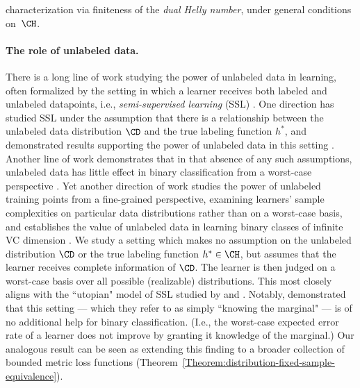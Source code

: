 \documentclass[11pt]{article}
\begin{document}
characterization via finiteness of the \emph{dual Helly number}, under general conditions on~$\CH$.  

\paragraph{The role of unlabeled data.} There is a long line of work studying the power of unlabeled data in learning, often formalized by the setting in which a learner receives both labeled and unlabeled datapoints, i.e., \emph{semi-supervised learning} (SSL) \citep{kaariainen2005generalization,zhu2005semi,chapelle2006semi,van2020survey}. One direction has studied SSL under the assumption that there is a relationship between the unlabeled data distribution $\CD$ and the true labeling function $h^*$, and demonstrated results supporting the power of unlabeled data in this setting \citep{castelli1995exponential,seeger2000learning,rigollet2007generalization,singh2008unlabeled,niyogi2013manifold}. Another line of work demonstrates that in that absence of any such assumptions, unlabeled data has little effect in binary classification from a worst-case perspective \citep{ben2008does,darnstadt2011smart,gopfert2019can}. Yet another direction of work studies the power of unlabeled training points from a fine-grained perspective, examining learners' sample complexities on particular data distributions rather than on a worst-case basis, and establishes the value of unlabeled data in learning binary classes of infinite VC dimension \citep{darnstadt2013unlabeled}.
We study a setting which makes no assumption on the unlabeled distribution $\CD$ or the true labeling function $h^* \in \CH$, but assumes that the learner receives complete information of $\CD$. The learner is then judged on a worst-case basis over all possible (realizable) distributions. This most closely aligns with the ``utopian" model of SSL studied by \citet{ben2008does} and \citet{lu2009fundamental}. Notably, \citet{gopfert2019can} demonstrated that this setting --- which they refer to as simply ``knowing the marginal" --- is of no additional help for binary classification. (I.e., the worst-case expected error rate of a learner does not improve by granting it knowledge of the marginal.) Our analogous result can be seen as extending this finding to a broader collection of bounded metric loss functions (Theorem~\ref{Theorem:distribution-fixed-sample-equivalence}).
\end{document}
